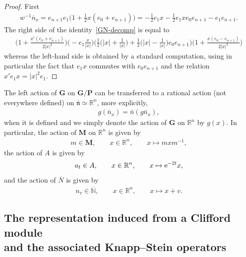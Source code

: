 \documentclass[pdftex]{sigma}
\numberwithin{equation}{section}
\begin{document}
\begin{proof}
First
\begin{gather*}
w^{-1} \overline n_x= e_{n+1}e_1\bigg(1+\frac{1}{2}x(e_0+e_{n+1})\bigg)
 =-\frac{1}{2}e_1x-\frac{1}{2}e_1xe_0e_{n+1}-e_1e_{n+1} .
\end{gather*}
The right side of the identity~\eqref{GN-decomp} is equal to
\begin{gather*}
 \bigg(\!1+\frac{x'(e_0+e_{n+1})}{2\vert x \vert^2}\bigg)
 \bigg(\!{-}e_1\frac{x}{\vert x\vert}\bigg)\bigg(\frac{1}{2}\bigg(\!\vert x\vert +\frac{1}{\vert x\vert}\bigg) + \frac{1}{2}\bigg(\!\vert x\vert -\frac{1}{\vert x\vert}\bigg)e_0e_{n+1}\bigg)
 \bigg(\!1+\frac{x(e_0-e_{n+1})}{2\vert x \vert^2} \bigg)
\end{gather*}
whereas the left-hand side is obtained by a standard computation, using in particular the fact that $e_1x$ commutes with $e_0 e_{n+1}$ and the relation $x'e_1x = \vert x\vert^2 e_1$.
\end{proof}

 The left action of $\mathbf G$ on $\mathbf G/\mathbf P$ can be transferred to a rational action (not everywhere defined) on $\overline {\mathfrak n} \simeq \mathbb R^n$,
more explicitly,
\begin{gather*}
g(\bar n_x)= \bar n( g\bar n_x),
\end{gather*}
when it is defined and we simply denote the action of $\mathbf G$ on $\mathbb R^n$ by $g(x)$.
 In particular, the action of $\mathbf M$ on $\mathbb R^n$ is given by
\begin{gather*}
m\in \mathbf M,\qquad x\in \mathbb R^n, \qquad x\mapsto mxm^{-1},
\end{gather*}
the action of $A$ is given by
\begin{gather*}
a_t\in A,\qquad x\in \mathbb R^n,\qquad x\mapsto {{\rm e}^{-2t} x},
\end{gather*}
and the action of $\overline N$ is given by
\begin{gather*}
n_v\in \mathbb \overline N,\qquad x\in \mathbb R^n,\qquad x\mapsto x+v.
\end{gather*}

\subsection[The representation induced from a Clifford module and the associated Knapp--Stein operators]
{The representation induced from a Clifford module \\and the associated Knapp--Stein operators}\label{S33}
\end{document}
